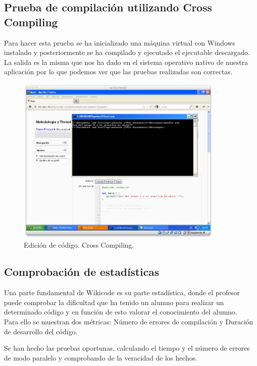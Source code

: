 \newpage

\subsection{Prueba de compilación utilizando Cross Compiling}
	
Para hacer esta prueba se ha inicializado una máquina virtual con Windows instalado y posteriormente se ha compilado y ejecutado el ejecutable descargado. La salida es la misma que nos ha dado en el sistema operativo nativo de nuestra aplicación por lo que podemos ver que las pruebas realizadas son correctas.
	
\begin{figure}[h]
	\centering
	\includegraphics[width=0.9\textwidth]{./img/windows.eps}
	\caption{Edición de código. Cross Compiling.}
\end{figure}		
	
\subsection{Comprobación de estadísticas}
	
Una parte fundamental de Wikicode es su parte estadística, donde el profesor puede comprobar la dificultad que ha tenido un alumno para realizar un determinado código y en función de esto valorar el conocimiento del alumno. Para ello se muestran dos métricas: Número de errores de compilación y Duración de desarrollo del código.

Se han hecho las pruebas oportunas, calculando el tiempo y el número de errores de modo paralelo y comprobando de la veracidad de los hechos.
	
